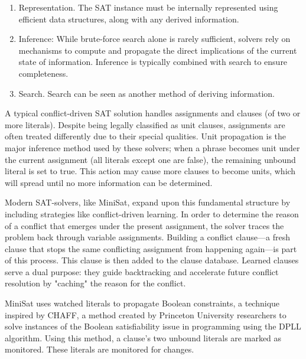 \documentclass[runningheads]{llncs}
\begin{document}
\vspace{15mm}

\begin{enumerate}
  \item Representation. The SAT instance must be internally represented using efficient data structures, along with any derived information.

  \item Inference: While brute-force search alone is rarely sufficient, solvers rely on mechanisms to compute and propagate the direct implications of the current state of information. Inference is typically combined with search to ensure completeness.
  
  \item Search.  Search can be seen as another method of deriving information. 
  
  
\end{enumerate}

A typical conflict-driven SAT solution handles assignments and clauses (of two or more literals). Despite being legally classified as unit clauses, assignments are often treated differently due to their special qualities. Unit propagation is the major inference method used by these solvers; when a phrase becomes unit under the current assignment (all literals except one are false), the remaining unbound literal is set to true. This action may cause more clauses to become units, which will spread until no more information can be determined.


Modern SAT-solvers, like MiniSat, expand upon this fundamental structure by including strategies like conflict-driven learning. In order to determine the reason of a conflict that emerges under the present assignment, the solver traces the problem back through variable assignments. Building a conflict clause—a fresh clause that stops the same conflicting assignment from happening again—is part of this process. This clause is then added to the clause database. Learned clauses serve a dual purpose: they guide backtracking and accelerate future conflict resolution by "caching" the reason for the conflict.

MiniSat uses watched literals to propagate Boolean constraints, a technique inspired by CHAFF, a method created by Princeton University researchers to solve instances of the Boolean satisfiability issue in programming using the DPLL algorithm. Using this method, a clause's two unbound literals are marked as monitored. These literals are monitored for changes.
\end{document}

